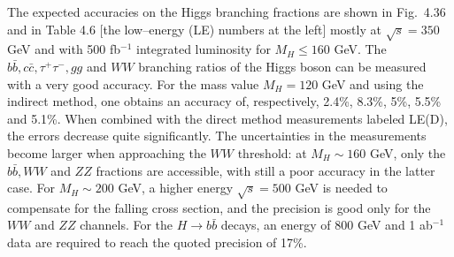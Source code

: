 \centerline{}
\vspace*{1.mm}
\vspace*{2.mm}

The expected accuracies on the Higgs branching fractions are shown in Fig.~4.36
and in Table 4.6 [the low--energy (LE) numbers at the left] mostly at 
$\sqrt{s}=350$ GeV and with 500 fb$^{-1}$ integrated luminosity for $M_H \leq 
160$ GeV. The $b\bar{b}, c\bar{c}, \tau^+ \tau^-,gg$ and $WW$ branching ratios 
of the Higgs boson can be measured with a very good accuracy. For the mass 
value $M_H=120$ GeV and using the indirect method, one obtains an accuracy of,
respectively, 2.4\%, 8.3\%, 5\%, 5.5\% and 5.1\%. When combined with the direct 
method measurements labeled LE(D), the errors decrease quite significantly. The
uncertainties in the measurements become larger when approaching the $WW$ 
threshold: at $M_H \sim 160$ GeV, only the $b\bar b, WW$ and $ZZ$ fractions are 
accessible, with still a poor accuracy in the latter case.
For $M_H \sim 200$ GeV, a higher energy $\sqrt{s}=500$ GeV is needed to
compensate for the falling cross section, and the precision is good only
for the $WW$ and $ZZ$ channels. For the $H\to b\bar b$ decays, an energy of 
800 GeV and 1 ab$^{-1}$ data are required to reach the quoted precision of
17\%. \s

